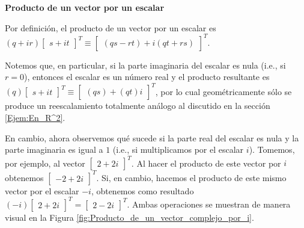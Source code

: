 \documentclass[12pt]{article}
\begin{document}
\vspace{3mm}
\textbf{Producto de un vector por un escalar}
\vspace{3mm}

Por definición, el producto de un vector por un escalar es $(q+ir)\begin{bmatrix}s+it\end{bmatrix}^T\equiv\begin{bmatrix}(qs-rt)+i(qt+rs)\end{bmatrix}^T$.

Notemos que, en particular, si la parte imaginaria del escalar es nula (i.e., si $r=0$), entonces el escalar es un número real y el producto resultante es $(q)\begin{bmatrix}s+it\end{bmatrix}^T\equiv\begin{bmatrix}(qs)+(qt)i\end{bmatrix}^T$, por lo cual geométricamente sólo se produce un reescalamiento totalmente análogo al discutido en la sección \ref{Ejem:En_R^2}.

En cambio, ahora observemos qué sucede si la parte real del escalar es nula y la parte imaginaria es igual a $1$ (i.e., si multiplicamos por el escalar $i$). Tomemos, por ejemplo, al vector $\begin{bmatrix}2+2i\end{bmatrix}^T$. Al hacer el producto de este vector por $i$ obtenemos $\begin{bmatrix}-2+2i\end{bmatrix}^T$. Si, en cambio, hacemos el producto de este mismo vector por el escalar $-i$, obtenemos como resultado $(-i)\begin{bmatrix}2+2i\end{bmatrix}^T=\begin{bmatrix}2-2i\end{bmatrix}^T$. Ambas operaciones se muestran de manera visual en la Figura \ref{fig:Producto_de_un_vector_complejo_por_i}.
\end{document}
